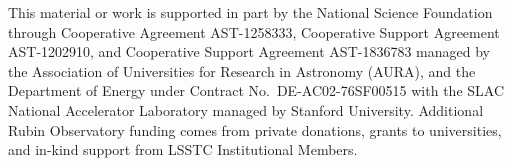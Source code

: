 \documentclass[]{spie}
\begin{document}
\acknowledgments

This material or work is supported in part by the National Science Foundation through Cooperative Agreement AST-1258333, Cooperative Support Agreement AST-1202910, and Cooperative Support Agreement AST-1836783 managed by the Association of Universities for Research in Astronomy (AURA), and the Department of Energy under Contract No.\ DE-AC02-76SF00515 with the SLAC National Accelerator Laboratory managed by Stanford University.
Additional Rubin Observatory funding comes from private donations, grants to universities, and in-kind support from LSSTC Institutional Members.



\end{document}
